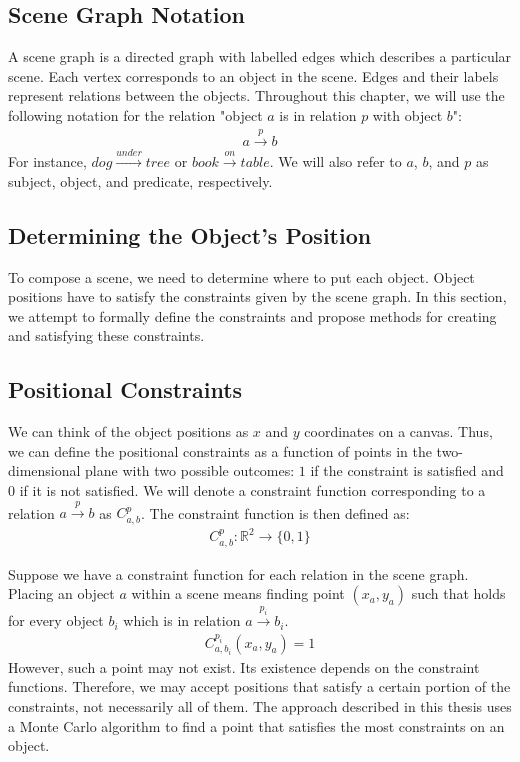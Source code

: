 \subsection{Scene Graph Notation}
\label{sec:scene_graph_notation}

A scene graph is a directed graph with labelled edges which describes a particular scene. Each vertex corresponds to an object in the scene. Edges and their labels represent relations between the objects. Throughout this chapter, we will use the following notation for the relation "object $a$ is in relation $p$ with object $b$":
\begin{align}
    a \xrightarrow{p} b
\end{align}
For instance, $dog \xrightarrow{under} tree$ or $book \xrightarrow{on} table$. We will also refer to $a$, $b$, and $p$ as subject, object, and predicate, respectively.

\subsection{Determining the Object's Position}

To compose a scene, we need to determine where to put each object. Object positions have to satisfy the constraints given by the scene graph. In this section, we attempt to formally define the constraints and propose methods for creating and satisfying these constraints. 

\subsection{Positional Constraints}
\label{sec:constraints}

We can think of the object positions as $x$ and $y$ coordinates on a canvas. Thus, we can define the positional constraints as a function of points in the two-dimensional plane with two possible outcomes: $1$ if the constraint is satisfied and $0$ if it is not satisfied. We will denote a constraint function corresponding to a relation $a \xrightarrow{p} b$ as $C_{a,b}^p$. The constraint function is then defined as: 
\begin{align}
    C_{a,b}^p\colon \mathbb{R}^2 \rightarrow \{0, 1\}
    \label{constraint_function}
\end{align}

Suppose we have a constraint function for each relation in the scene graph. Placing an object $a$ within a scene means finding point $(x_a, y_a)$ such that  holds for every object $b_i$ which is in relation $a \xrightarrow{p_i} b_i$.
\begin{align}
\label{math:satisfied}
C_{a,b_i}^{p_i}(x_a, y_a) = 1
\end{align}
However, such a point may not exist. Its existence depends on the constraint functions. Therefore, we may accept positions that satisfy a certain portion of the constraints, not necessarily all of them. The approach described in this thesis uses a Monte Carlo algorithm to find a point that satisfies the most constraints on an object. 

